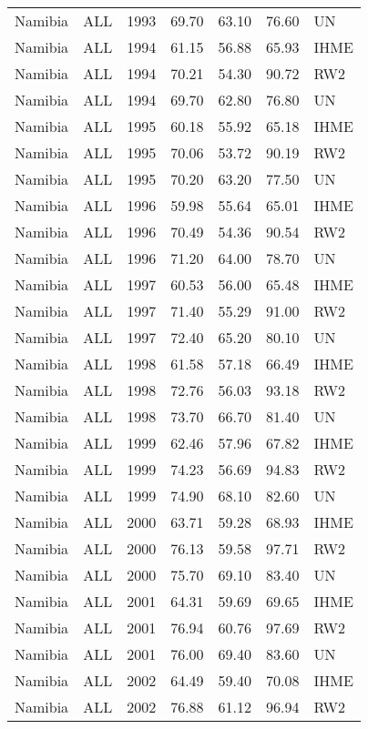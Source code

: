 \begin{longtable}{lllrrrl}
  Namibia & ALL & 1993 & 69.70 & 63.10 & 76.60 & UN \\ 
  Namibia & ALL & 1994 & 61.15 & 56.88 & 65.93 & IHME \\ 
  Namibia & ALL & 1994 & 70.21 & 54.30 & 90.72 & RW2 \\ 
  Namibia & ALL & 1994 & 69.70 & 62.80 & 76.80 & UN \\ 
  Namibia & ALL & 1995 & 60.18 & 55.92 & 65.18 & IHME \\ 
  Namibia & ALL & 1995 & 70.06 & 53.72 & 90.19 & RW2 \\ 
  Namibia & ALL & 1995 & 70.20 & 63.20 & 77.50 & UN \\ 
  Namibia & ALL & 1996 & 59.98 & 55.64 & 65.01 & IHME \\ 
  Namibia & ALL & 1996 & 70.49 & 54.36 & 90.54 & RW2 \\ 
  Namibia & ALL & 1996 & 71.20 & 64.00 & 78.70 & UN \\ 
  Namibia & ALL & 1997 & 60.53 & 56.00 & 65.48 & IHME \\ 
  Namibia & ALL & 1997 & 71.40 & 55.29 & 91.00 & RW2 \\ 
  Namibia & ALL & 1997 & 72.40 & 65.20 & 80.10 & UN \\ 
  Namibia & ALL & 1998 & 61.58 & 57.18 & 66.49 & IHME \\ 
  Namibia & ALL & 1998 & 72.76 & 56.03 & 93.18 & RW2 \\ 
  Namibia & ALL & 1998 & 73.70 & 66.70 & 81.40 & UN \\ 
  Namibia & ALL & 1999 & 62.46 & 57.96 & 67.82 & IHME \\ 
  Namibia & ALL & 1999 & 74.23 & 56.69 & 94.83 & RW2 \\ 
  Namibia & ALL & 1999 & 74.90 & 68.10 & 82.60 & UN \\ 
  Namibia & ALL & 2000 & 63.71 & 59.28 & 68.93 & IHME \\ 
  Namibia & ALL & 2000 & 76.13 & 59.58 & 97.71 & RW2 \\ 
  Namibia & ALL & 2000 & 75.70 & 69.10 & 83.40 & UN \\ 
  Namibia & ALL & 2001 & 64.31 & 59.69 & 69.65 & IHME \\ 
  Namibia & ALL & 2001 & 76.94 & 60.76 & 97.69 & RW2 \\ 
  Namibia & ALL & 2001 & 76.00 & 69.40 & 83.60 & UN \\ 
  Namibia & ALL & 2002 & 64.49 & 59.40 & 70.08 & IHME \\ 
  Namibia & ALL & 2002 & 76.88 & 61.12 & 96.94 & RW2 \\ 

\end{longtable}
